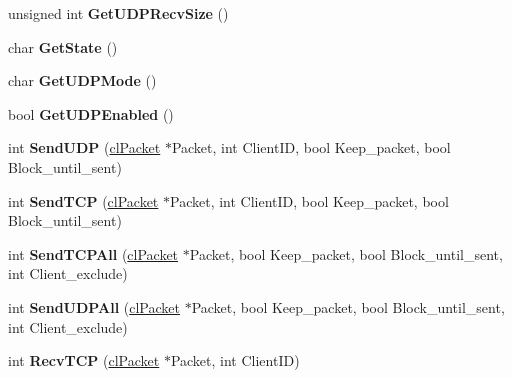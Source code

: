 \begin{DoxyCompactItemize}
\item 
\hypertarget{classcl_instance_a9c6366f90442c8fb31d4bd07905173e8}{
unsigned int {\bfseries GetUDPRecvSize} ()}
\label{classcl_instance_a9c6366f90442c8fb31d4bd07905173e8}

\item 
\hypertarget{classcl_instance_a8337df65a4606731f3cba78361915c3d}{
char {\bfseries GetState} ()}
\label{classcl_instance_a8337df65a4606731f3cba78361915c3d}

\item 
\hypertarget{classcl_instance_aee76e9b9909beda7b13aead4a6412293}{
char {\bfseries GetUDPMode} ()}
\label{classcl_instance_aee76e9b9909beda7b13aead4a6412293}

\item 
\hypertarget{classcl_instance_a755c8e6e4bee1e1c47533606e8bb9623}{
bool {\bfseries GetUDPEnabled} ()}
\label{classcl_instance_a755c8e6e4bee1e1c47533606e8bb9623}

\item 
\hypertarget{classcl_instance_a8518cc75493dce11afcb8fcaeaaf5521}{
int {\bfseries SendUDP} (\hyperlink{classcl_packet}{clPacket} $\ast$Packet, int ClientID, bool Keep\_\-packet, bool Block\_\-until\_\-sent)}
\label{classcl_instance_a8518cc75493dce11afcb8fcaeaaf5521}

\item 
\hypertarget{classcl_instance_a08e22e27e461bbce7d0043cdfafac1c2}{
int {\bfseries SendTCP} (\hyperlink{classcl_packet}{clPacket} $\ast$Packet, int ClientID, bool Keep\_\-packet, bool Block\_\-until\_\-sent)}
\label{classcl_instance_a08e22e27e461bbce7d0043cdfafac1c2}

\item 
\hypertarget{classcl_instance_ae8c46345b656ecba3e0a77f4ef0fc603}{
int {\bfseries SendTCPAll} (\hyperlink{classcl_packet}{clPacket} $\ast$Packet, bool Keep\_\-packet, bool Block\_\-until\_\-sent, int Client\_\-exclude)}
\label{classcl_instance_ae8c46345b656ecba3e0a77f4ef0fc603}

\item 
\hypertarget{classcl_instance_a045d6329f1986744ce1770503c69c728}{
int {\bfseries SendUDPAll} (\hyperlink{classcl_packet}{clPacket} $\ast$Packet, bool Keep\_\-packet, bool Block\_\-until\_\-sent, int Client\_\-exclude)}
\label{classcl_instance_a045d6329f1986744ce1770503c69c728}

\item 
\hypertarget{classcl_instance_ad89dd5760482eee5af918e889a974471}{
int {\bfseries RecvTCP} (\hyperlink{classcl_packet}{clPacket} $\ast$Packet, int ClientID)}
\label{classcl_instance_ad89dd5760482eee5af918e889a974471}


\end{DoxyCompactItemize}

